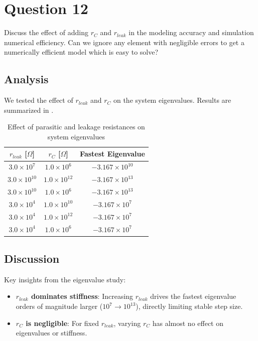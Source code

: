 
\clearpage
\section*{Question 12}

Discuss the effect of adding $r_C$ and $r_{leak}$ in the modeling accuracy and simulation numerical efficiency. Can we ignore any element with negligible errors to get a numerically efficient model which is easy to solve?

\subsection*{Analysis}

We tested the effect of $r_{leak}$ and $r_C$ on the system eigenvalues. Results are summarized in .

\begin{table}[h!]
    \centering
    \begin{tabular}{|c|c|c|}
        \hline
        \textbf{$r_{leak}$ [$\Omega$]} & \textbf{$r_C$ [$\Omega$]} & \textbf{Fastest Eigenvalue} \\
        \hline
        $3.0 \times 10^{7}$ & $1.0 \times 10^{6}$ & $-3.167 \times 10^{10}$ \\
        $3.0 \times 10^{10}$ & $1.0 \times 10^{12}$ & $-3.167 \times 10^{13}$ \\
        $3.0 \times 10^{10}$ & $1.0 \times 10^{6}$ & $-3.167 \times 10^{13}$ \\
        $3.0 \times 10^{4}$ & $1.0 \times 10^{10}$ & $-3.167 \times 10^{7}$ \\
        $3.0 \times 10^{4}$ & $1.0 \times 10^{12}$ & $-3.167 \times 10^{7}$ \\
        $3.0 \times 10^{4}$ & $1.0 \times 10^{6}$ & $-3.167 \times 10^{7}$ \\
        \hline
    \end{tabular}
    \caption{Effect of parasitic and leakage resistances on system eigenvalues}
    \label{tab:parasitic_eigenvalues}
\end{table}

\subsection*{Discussion}

Key insights from the eigenvalue study:
\begin{itemize}
    \item \textbf{$r_{leak}$ dominates stiffness}: Increasing $r_{leak}$ drives the fastest eigenvalue orders of magnitude larger ($10^7 \to 10^{13}$), directly limiting stable step size. 
    \item \textbf{$r_C$ is negligible}: For fixed $r_{leak}$, varying $r_C$ has almost no effect on eigenvalues or stiffness.
\end{itemize}

